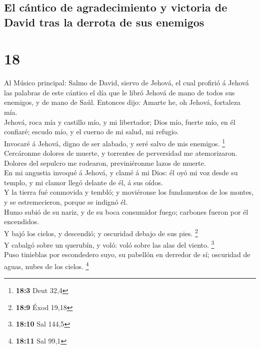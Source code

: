 \hypertarget{el-cuxe1ntico-de-agradecimiento-y-victoria-de-david-tras-la-derrota-de-sus-enemigos}{%
\subsection{El cántico de agradecimiento y victoria de David tras la
derrota de sus
enemigos}\label{el-cuxe1ntico-de-agradecimiento-y-victoria-de-david-tras-la-derrota-de-sus-enemigos}}

\hypertarget{section-17}{%
\section{18}\label{section-17}}

 Al Músico principal: Salmo de David, siervo de Jehová, el
cual profirió á Jehová las palabras de este cántico el día que le libró
Jehová de mano de todos sus enemigos, y de mano de Saúl. Entonces dijo:
Amarte he, oh Jehová, fortaleza mía.\\
 Jehová, roca mía y castillo mío, y mi libertador; Dios mío,
fuerte mío, en él confiaré; escudo mío, y el cuerno de mi salud, mi
refugio.\\
 Invocaré á Jehová, digno de ser alabado, y seré salvo de
mis enemigos. \footnote{\textbf{18:3} Deut 32,4}\\
 Cercáronme dolores de muerte, y torrentes de perversidad me
atemorizaron.\\
 Dolores del sepulcro me rodearon, previniéronme lazos de
muerte.\\
 En mi angustia invoqué á Jehová, y clamé á mi Dios: él oyó
mi voz desde su templo, y mi clamor llegó delante de él, á sus oídos.\\
 Y la tierra fué conmovida y tembló; y moviéronse los
fundamentos de los montes, y se estremecieron, porque se indignó él.\\
 Humo subió de su nariz, y de su boca consumidor fuego;
carbones fueron por él encendidos.\\
 Y bajó los cielos, y descendió; y oscuridad debajo de sus
pies. \footnote{\textbf{18:9} Éxod 19,18}\\
 Y cabalgó sobre un querubín, y voló: voló sobre las alas
del viento. \footnote{\textbf{18:10} Sal 144,5}\\
 Puso tinieblas por escondedero suyo, su pabellón en
derredor de sí; oscuridad de aguas, nubes de los cielos. \footnote{\textbf{18:11}
  Sal 99,1}\\

